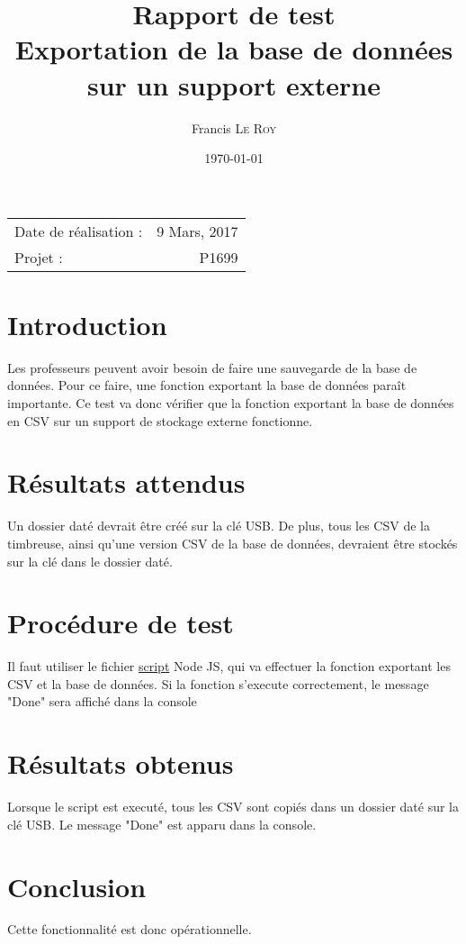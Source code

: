 \documentclass[10pt,a4paper,onecolumn]{article}
\title{Rapport de test \\ Exportation de la base de données \\ sur un support externe}
\author{Francis \textsc{Le Roy}}
\date{\today}
\begin{document}
\maketitle
\thispagestyle{fancy}

\begin{center}
\begin{tabular}{l r}
Date de réalisation : & 9 Mars, 2017 \\
Projet : & P1699 \\
\end{tabular}
\end{center}

\section{Introduction}
Les professeurs peuvent avoir besoin de faire une sauvegarde de la base de données. Pour ce faire, une fonction exportant la base de données paraît importante. Ce test va donc vérifier que la fonction exportant la base de données en CSV sur un support de stockage externe fonctionne.
\section{Résultats attendus}
Un dossier daté devrait être créé sur la clé USB. De plus, tous les CSV de la timbreuse, ainsi qu'une version CSV de la base de données, devraient être stockés sur la clé dans le dossier daté.
\section{Procédure de test}
Il faut utiliser le fichier \href{run:../../../test/export_db.js}{script} Node JS, qui va effectuer la fonction exportant les CSV et la base de données. Si la fonction s'execute correctement, le message "Done" sera affiché dans la console
\section{Résultats obtenus}
Lorsque le script est executé, tous les CSV sont copiés dans un dossier daté sur la clé USB. Le message "Done" est apparu dans la console.
\section{Conclusion}
Cette fonctionnalité est donc opérationnelle.
\end{document}
